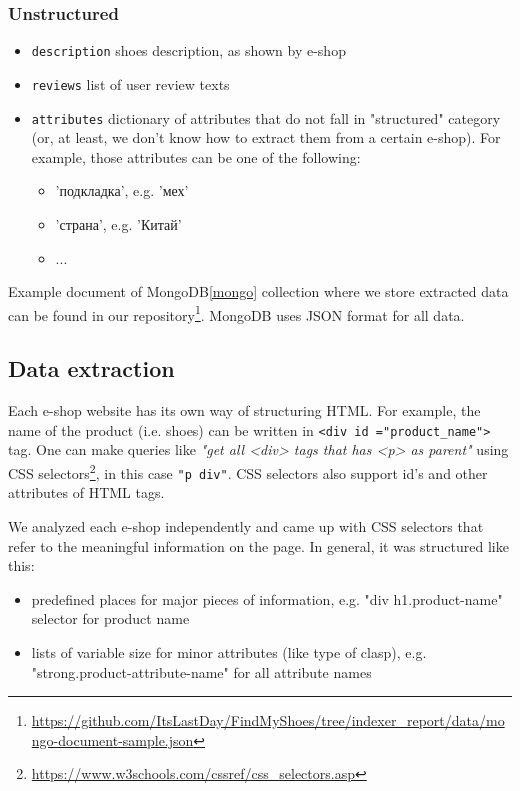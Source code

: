 \subsubsection{Unstructured}
\begin{itemize}
    \item \texttt{description} shoes description, as shown by e-shop
    \item \texttt{reviews} list of user review texts
\item \texttt{attributes} dictionary of attributes that do not fall in "structured" category (or, at least, we don't know how to extract them from a certain e-shop). For example, those attributes can be one of the following: 
        \begin{itemize}
            \item 'подкладка', e.g. 'мех'
            \item 'страна', e.g. 'Китай'
            \item ...
        \end{itemize}
\end{itemize}

Example document of MongoDB\cref{mongo} collection where we store ext\-rac\-ted data can be found in our repository\footnote{\url{https://github.com/ItsLastDay/FindMyShoes/tree/indexer_report/data/mongo-document-sample.json}}. MongoDB uses JSON format for all data.

\subsection{Data extraction}
Each e-shop website has its own way of structuring HTML. For example, the name of the product (i.e. shoes) can be written in \texttt{<div id ="product\_name">} tag. One can make queries like \textit{"get all <div> tags that has <p> as parent"} using CSS selectors\footnote{\url{https://www.w3schools.com/cssref/css_selectors.asp}}, in this case \texttt{"p div"}. CSS selectors also support id's and other attributes of HTML tags.

We analyzed each e-shop independently and came up with CSS selectors that refer to the meaningful information on the page. In general, it was structured like this: 
\begin{itemize}
    \item predefined places for major pieces of information, e.g. "div h1.product-name" selector for product name
    \item lists of variable size for minor attributes (like type of clasp), e.g. "strong.product-attribute-name" for all attribute names
\end{itemize}

